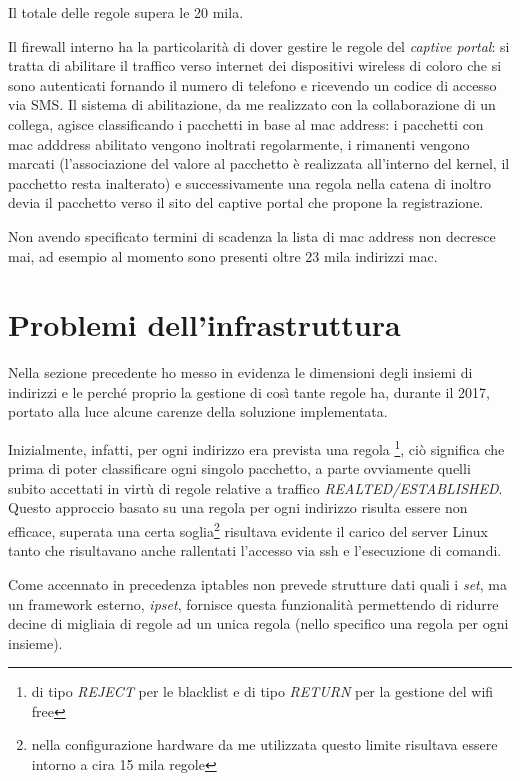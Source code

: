 \noindent Il totale delle regole supera le 20 mila.

Il firewall interno ha la particolarità di dover gestire le regole del {\em
captive portal}: si tratta di abilitare il traffico verso internet dei
dispositivi wireless di coloro che si sono autenticati fornando il numero di
telefono e ricevendo un codice di accesso via SMS.  Il sistema di
abilitazione, da me realizzato con la collaborazione di un collega, agisce
classificando i pacchetti in base al mac address: i pacchetti con mac adddress
abilitato vengono inoltrati regolarmente, i rimanenti vengono marcati
(l'associazione del valore al pacchetto è realizzata all'interno del kernel,
il pacchetto resta inalterato) e successivamente una regola nella catena di
inoltro devia il pacchetto verso il sito del captive portal che propone la
registrazione.

Non avendo specificato termini di scadenza la lista di mac address non
decresce mai, ad esempio al momento sono presenti oltre 23 mila indirizzi mac.

\section{Problemi dell'infrastruttura}

Nella sezione precedente ho messo in evidenza le dimensioni degli insiemi di
indirizzi e le perché proprio la gestione di così tante regole ha, durante il
2017, portato alla luce alcune carenze della soluzione implementata.

Inizialmente, infatti, per ogni indirizzo era prevista una regola
\footnote{di tipo {\em REJECT} per le blacklist e di tipo {\em RETURN} per la
gestione del wifi free},
ciò significa che prima di poter classificare ogni singolo pacchetto,
a parte ovviamente quelli subito accettati in virtù di regole relative a
traffico {\em REALTED/ESTABLISHED}.  Questo approccio basato su una regola
per ogni indirizzo risulta essere non efficace, superata una certa
soglia\footnote{nella configurazione hardware da me utilizzata questo limite
risultava essere intorno a cira 15 mila regole} risultava evidente il carico
del server Linux tanto che risultavano anche rallentati l'accesso via ssh e
l'esecuzione di comandi.

Come accennato in precedenza iptables non prevede strutture dati quali i {\em
set}, ma un framework esterno, {\em ipset}, fornisce questa funzionalità
permettendo di ridurre decine di migliaia di regole ad un unica regola (nello
specifico una regola per ogni insieme).

